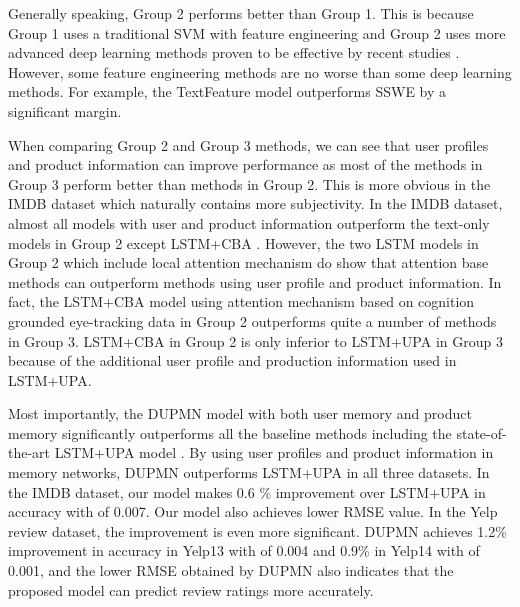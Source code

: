 \documentclass[11pt,a4paper]{article}
\begin{document}
Generally speaking, Group 2 performs better than Group 1. This is because Group 1 uses a traditional SVM with feature engineering \cite{chang2011libsvm} and Group 2 uses more advanced deep learning methods proven to be effective by recent studies \cite{kim2014convolutional,chen2016neural}. However, some feature engineering methods are no worse than some deep learning methods. For example, the TextFeature model outperforms SSWE by a significant margin. 

When comparing Group 2 and Group 3 methods, we can see that user profiles and product information can improve performance as most of the methods in Group 3 perform better than methods in Group 2. This is more obvious in the IMDB dataset which naturally contains more subjectivity. In the IMDB dataset, almost all models with user and product information outperform the text-only models in Group 2 except LSTM+CBA \cite{long2017cognition}. However, the two LSTM models in Group 2 which include local attention mechanism do show that attention base methods can outperform methods using user profile and product information. In fact, the LSTM+CBA model using attention mechanism based on cognition grounded eye-tracking data in Group 2 outperforms quite a number of methods in Group 3. LSTM+CBA in Group 2 is only inferior to LSTM+UPA in Group 3 because of the additional user profile and production information used in LSTM+UPA. 

Most importantly, the DUPMN model with both user memory and product memory significantly outperforms all the baseline methods including the state-of-the-art LSTM+UPA model \cite{chen2016neural}. By using user profiles and product information in memory networks, DUPMN outperforms LSTM+UPA in all three datasets. In the IMDB dataset, our model makes 0.6 \% improvement over LSTM+UPA in accuracy with  of 0.007. Our model also achieves lower RMSE value. In the Yelp review dataset, the improvement is even more significant. DUPMN  achieves 1.2\% improvement in accuracy in Yelp13 with  of 0.004 and 0.9\% in Yelp14 with  of 0.001, and the lower RMSE obtained by DUPMN also indicates that the proposed model can predict review ratings more accurately.
\end{document}

